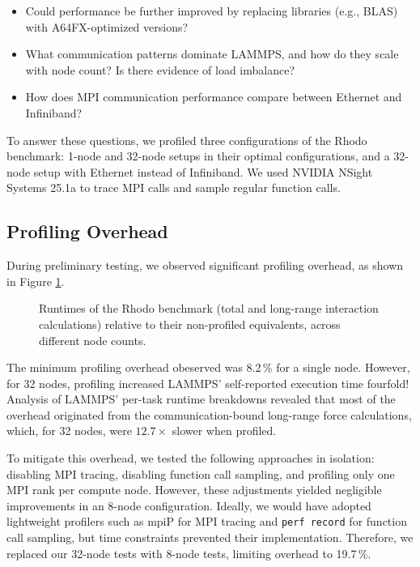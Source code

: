 \documentclass[sigplan, nonacm, screen]{acmart}
\begin{document}
\begin{itemize}
    \item Could performance be further improved by replacing libraries (e.g., BLAS) with
          A64FX-optimized versions?
    \item What communication patterns dominate LAMMPS, and how do they scale with node count? Is
          there evidence of load imbalance?
    \item How does MPI communication performance compare between Ethernet and Infiniband?
\end{itemize}

To answer these questions, we profiled three configurations of the Rhodo benchmark: 1-node and
32-node setups in their optimal configurations, and a 32-node setup with Ethernet instead of
Infiniband. We used NVIDIA NSight Systems 25.1a \cite{nvidia-nsight} to trace MPI calls and sample
regular function calls.

\subsection{Profiling Overhead} %
\label{profiling-overhead}

During preliminary testing, we observed significant profiling overhead, as shown in Figure
\ref{overhead-plot}.

\begin{figure}[h]
    
    \caption{
        Runtimes of the Rhodo benchmark (total and long-range interaction calculations)
        relative to their non-profiled equivalents, across different node counts.
    }
    \label{overhead-plot}
\end{figure}

The minimum profiling overhead obeserved was 8.2\,\% for a single node. However, for 32 nodes,
profiling increased LAMMPS' self-reported execution time fourfold! Analysis of LAMMPS' per-task
runtime breakdowns revealed that most of the overhead originated from the \linebreak[4]
communication-bound long-range force calculations, \linebreak[4] which, for 32 nodes, were
$12.7\times$ slower when profiled.

To mitigate this overhead, we tested the following approaches in isolation: disabling MPI tracing,
disabling function call sampling, and profiling only one MPI rank per compute node. However, these
adjustments yielded negligible improvements in an 8-node configuration. Ideally, we would have
adopted lightweight profilers such as mpiP for MPI tracing \cite{mpip} and \texttt{perf record}
\cite{perf} for function call sampling, but time constraints prevented their implementation.
Therefore, we replaced our 32-node tests with 8-node tests, limiting overhead to 19.7\,\%.
\end{document}
